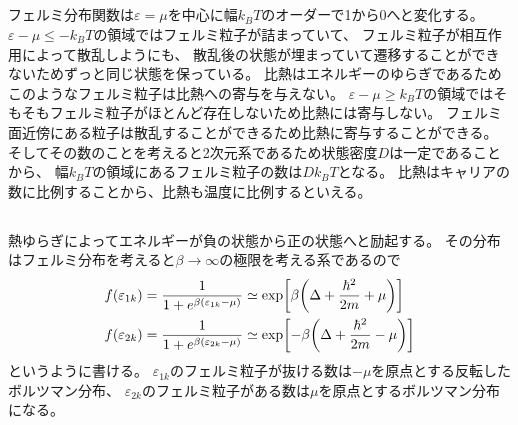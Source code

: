 \documentclass[../../sp_2013.tex]{subfiles}
\begin{document}
\subsection{}
フェルミ分布関数は\(\varepsilon=\mu\)を中心に幅\(k_BT\)のオーダーで1から0へと変化する。
\(\varepsilon-\mu\le -k_BT\)の領域ではフェルミ粒子が詰まっていて、
フェルミ粒子が相互作用によって散乱しようにも、
散乱後の状態が埋まっていて遷移することができないためずっと同じ状態を保っている。
比熱はエネルギーのゆらぎであるためこのようなフェルミ粒子は比熱への寄与を与えない。
\(\varepsilon-\mu\ge k_BT\)の領域ではそもそもフェルミ粒子がほとんど存在しないため比熱には寄与しない。
フェルミ面近傍にある粒子は散乱することができるため比熱に寄与することができる。
そしてその数のことを考えると2次元系であるため状態密度\(D\)は一定であることから、
幅\(k_BT\)の領域にあるフェルミ粒子の数は\(Dk_BT\)となる。
比熱はキャリアの数に比例することから、比熱も温度に比例するといえる。

\subsection{}
熱ゆらぎによってエネルギーが負の状態から正の状態へと励起する。
その分布はフェルミ分布を考えると\(\beta\to\infty\)の極限を考える系であるので
\begin{equation}\begin{aligned}[b]
    f(\varepsilon_{1k})
    &=\frac{1}{1+e^{\beta(\varepsilon_{1k}-\mu)}}
    \simeq \exp[\beta\qty(\Delta+\frac{\hbar^2}{2m}+\mu)]\\
    f(\varepsilon_{2k})
    &=\frac{1}{1+e^{\beta(\varepsilon_{2k}-\mu)}}
    \simeq \exp[-\beta\qty(\Delta+\frac{\hbar^2}{2m}-\mu)]\\
\end{aligned}\end{equation}
というように書ける。
\(\varepsilon_{1k}\)のフェルミ粒子が抜ける数は\(-\mu\)を原点とする反転したボルツマン分布、
\(\varepsilon_{2k}\)のフェルミ粒子がある数は\(\mu\)を原点とするボルツマン分布になる。
\end{document}

